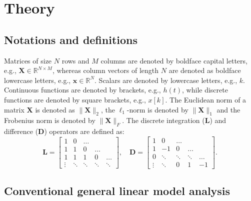 
\section{Theory}

\subsection{Notations and definitions}

Matrices of size $N$ rows and $M$ columns are denoted by boldface capital letters, e.g., $\mathbf{X} \in \mathbb{R}^{N\times M}$, whereas column vectors of length $N$ are denoted as boldface lowercase letters, e.g., $\mathbf{x} \in \mathbb{R}^{N}$. Scalars are denoted by lowercase letters, e.g., $k$. Continuous functions are denoted by brackets, e.g., $h(t)$, while discrete functions are denoted by square brackets, e.g., $x[k]$. The Euclidean norm of a matrix $\mathbf{X}$ is denoted as $\|\mathbf{X}\|_2$, the $\ell_1$-norm is denoted by $\| \mathbf{X} \|_1$ and the Frobenius norm is denoted by $\| \mathbf{X} \|_F$. The discrete integration ($\mathbf{L}$) and difference ($\mathbf{D}$) operators are defined as:
$$
\mathbf{L} = \left[\begin{array}{ccccc}
1 & 0 & \ldots & & \\
1 & 1 & 0 & \ldots & \\
1 & 1 & 1 & 0 & \ldots \\
\vdots & \ddots & \ddots & \ddots & \ddots
\end{array}\right], \quad \mathbf{D} = \left[\begin{array}{ccccc}
1 & 0 & \ldots & & \\
1 & -1 & 0 & \ldots & \\
0 & \ddots & \ddots & \ddots & \ldots \\
\vdots & \ddots & 0 & 1 & -1
\end{array}\right].
$$

\subsection{Conventional general linear model analysis}

